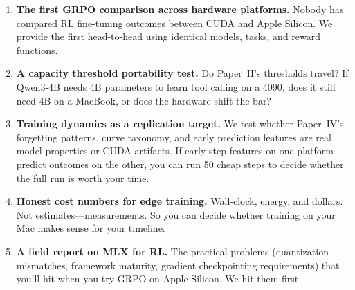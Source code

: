 \documentclass[11pt]{article}
\begin{document}
\begin{enumerate}[leftmargin=12pt]
    \item \textbf{The first GRPO comparison across hardware platforms.}  Nobody has compared RL fine-tuning outcomes between CUDA and Apple Silicon.  We provide the first head-to-head using identical models, tasks, and reward functions.

    \item \textbf{A capacity threshold portability test.}  Do Paper~II's thresholds travel?  If Qwen3-4B needs 4B parameters to learn tool calling on a 4090, does it still need 4B on a MacBook, or does the hardware shift the bar?

    \item \textbf{Training dynamics as a replication target.}  We test whether Paper~IV's forgetting patterns, curve taxonomy, and early prediction features are real model properties or CUDA artifacts.  If early-step features on one platform predict outcomes on the other, you can run 50 cheap steps to decide whether the full run is worth your time.

    \item \textbf{Honest cost numbers for edge training.}  Wall-clock, energy, and dollars.  Not estimates---measurements.  So you can decide whether training on your Mac makes sense for your timeline.

    \item \textbf{A field report on MLX for RL.}  The practical problems (quantization mismatches, framework maturity, gradient checkpointing requirements) that you'll hit when you try GRPO on Apple Silicon.  We hit them first.
\end{enumerate}
\end{document}

